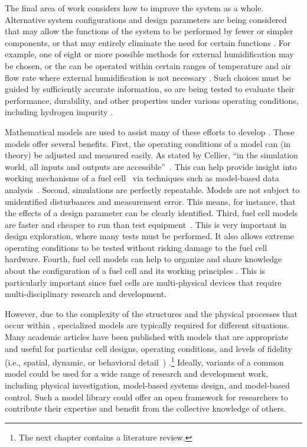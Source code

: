 The final area of work considers how to improve the  system as a whole.  Alternative  system configurations and design parameters are being considered that may allow the functions of the  system to be performed by fewer or simpler components, or that may entirely eliminate the need for certain functions \cite[p.~10]{DOE2007}.  For example, one of eight or more possible methods for external humidification may be chosen, or the  can be operated within certain ranges of temperature and air flow rate where external humidification is not necessary \cite[pp.~83--90]{Larminie2003}.  Such choices must be guided by sufficiently accurate information, so  are being tested to evaluate their performance, durability, and other properties under various operating conditions, including hydrogen impurity \cite[p.~9]{DOE2007}.

Mathematical models are used to assist many of these efforts to develop .  These models offer several benefits.  First, the operating conditions of a model can (in theory) be adjusted and measured easily.  As stated by Cellier, ``in the simulation world, all inputs and outputs are accessible''~\cite{Cellier1991}.  This can help provide insight into working mechanisms of a fuel cell~\cite{Faghri2005} via techniques such as model-based data analysis~\cite{Matzopoulos2007}.  Second, simulations are perfectly repeatable.  Models are not subject to unidentified disturbances and measurement error.  This means, for instance, that the effects of a design parameter can be clearly identified.  Third, fuel cell models are faster and cheaper to run than test equipment~\cite{Faghri2005, Matzopoulos2007}.  This is very important in design exploration, where many tests must be performed.  It also allows extreme operating conditions to be tested without risking damage to the fuel cell hardware.  Fourth, fuel cell models can help to organize and share knowledge about the configuration of a fuel cell and its working principles \cite{Matzopoulos2007}.  This is particularly important since fuel cells are multi-physical devices that require multi-disciplinary research and development.

However, due to the complexity of the structures and the physical processes that occur within , specialized models are typically required for different situations.  Many academic articles have been published with  models that are appropriate and useful for particular cell designs, operating conditions, and levels of fidelity (i.e., spatial, dynamic, or behavioral detail~\cite{Pyster2012}) %
\cite{Faghri2005}.\footnote{The next chapter contains a literature review.}  Ideally, variants of a common  model could be used for a wide range of research and development work, including physical investigation, model-based systems design, and model-based control.  Such a model library could offer an open framework for  researchers to contribute their expertise and benefit from the collective knowledge of others.

